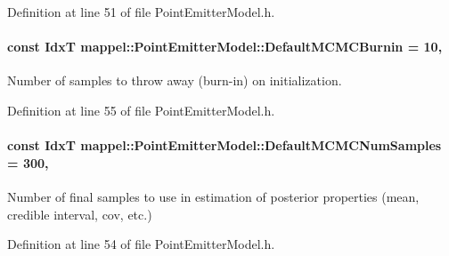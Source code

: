 Definition at line 51 of file Point\+Emitter\+Model.\+h.

\paragraph[{\texorpdfstring{Default\+M\+C\+M\+C\+Burnin}{DefaultMCMCBurnin}}]{\setlength{\rightskip}{0pt plus 5cm}const {\bf IdxT} mappel\+::\+Point\+Emitter\+Model\+::\+Default\+M\+C\+M\+C\+Burnin = 10\hspace{0.3cm}{\ttfamily [static]}, {\ttfamily [inherited]}}\hypertarget{classmappel_1_1PointEmitterModel_a6fc96e398771a33d5586c2af10a2e6d8}{}\label{classmappel_1_1PointEmitterModel_a6fc96e398771a33d5586c2af10a2e6d8}


Number of samples to throw away (burn-\/in) on initialization. 



Definition at line 55 of file Point\+Emitter\+Model.\+h.

\paragraph[{\texorpdfstring{Default\+M\+C\+M\+C\+Num\+Samples}{DefaultMCMCNumSamples}}]{\setlength{\rightskip}{0pt plus 5cm}const {\bf IdxT} mappel\+::\+Point\+Emitter\+Model\+::\+Default\+M\+C\+M\+C\+Num\+Samples = 300\hspace{0.3cm}{\ttfamily [static]}, {\ttfamily [inherited]}}\hypertarget{classmappel_1_1PointEmitterModel_a9bbed2f2e91f1e5f0f4f9389cd2de333}{}\label{classmappel_1_1PointEmitterModel_a9bbed2f2e91f1e5f0f4f9389cd2de333}


Number of final samples to use in estimation of posterior properties (mean, credible interval, cov, etc.) 



Definition at line 54 of file Point\+Emitter\+Model.\+h.

